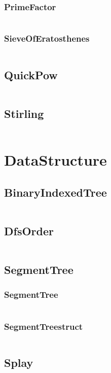 \documentclass[a4paper,11pt]{article}
\begin{document}
\subsubsection{PrimeFactor}
\inputminted[breaklines]{c++}{02++Math/+Prime/+PrimeFactor.cpp}
\subsubsection{SieveOfEratosthenes}
\inputminted[breaklines]{c++}{02++Math/+Prime/+SieveOfEratosthenes.cpp}

\subsection{QuickPow}
\inputminted[breaklines]{c++}{02++Math/+QuickPow.cpp}
\subsection{Stirling}
\inputminted[breaklines]{c++}{02++Math/+Stirling.cpp}

\newpage
\section{DataStructure}
\subsection{BinaryIndexedTree}
\inputminted[breaklines]{c++}{03++DataStructure/+BinaryIndexedTree.cpp}
\subsection{DfsOrder}
\inputminted[breaklines]{c++}{03++DataStructure/+DfsOrder.cpp}
\subsection{SegmentTree}
\subsubsection{SegmentTree}
\inputminted[breaklines]{c++}{03++DataStructure/+SegmentTree/+SegmentTree.cpp}
\subsubsection{SegmentTreestruct}
\inputminted[breaklines]{c++}{03++DataStructure/+SegmentTree/+SegmentTreestruct.cpp}

\subsection{Splay}
\end{document}
